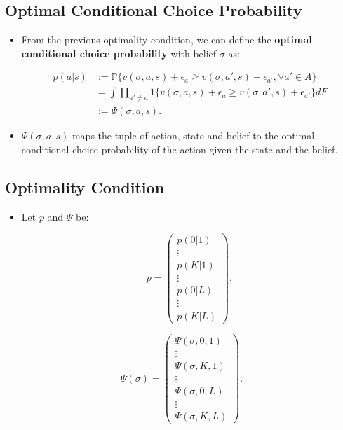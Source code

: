 \documentclass[]{book}
\providecommand{\tightlist}{%
  \setlength{\itemsep}{0pt}\setlength{\parskip}{0pt}}
\begin{document}
\subsection{Optimal Conditional Choice
Probability}\label{optimal-conditional-choice-probability}

\begin{itemize}
\tightlist
\item
  From the previous optimality condition, we can define the
  \textbf{optimal conditional choice probability} with belief \(\sigma\)
  as:

  \begin{equation}
  \begin{split}
  p(a|s) &:= \mathbb{P}\{v(\sigma, a, s) + \epsilon_{a} \ge v(\sigma, a', s) + \epsilon_{a'}, \forall a' \in A\}\\
  &= \int \prod_{a' \neq a} 1\{v(\sigma, a, s) + \epsilon_{a} \ge v(\sigma, a', s) + \epsilon_{a'}\} dF\\
  &:= \Psi(\sigma, a, s).
  \end{split}
  \end{equation}
\item
  \(\Psi(\sigma, a, s)\) maps the tuple of action, state and belief to
  the optimal conditional choice probability of the action given the
  state and the belief.
\end{itemize}

\subsection{Optimality Condition}\label{optimality-condition-1}

\begin{itemize}
\tightlist
\item
  Let \(p\) and \(\Psi\) be:

  \begin{equation}
  p = 
  \begin{pmatrix}
  p(0|1)\\
  \vdots\\
  p(K|1)\\
  \vdots\\
  p(0|L)\\
  \vdots\\
  p(K|L)
  \end{pmatrix},
  \end{equation}
\end{itemize}

\begin{equation}
\Psi(\sigma) = 
\begin{pmatrix}
\Psi(\sigma, 0, 1)\\
\vdots\\
\Psi(\sigma, K, 1)\\
\vdots\\
\Psi(\sigma, 0, L)\\
\vdots\\
\Psi(\sigma, K, L)
\end{pmatrix}.
\end{equation}
\end{document}

